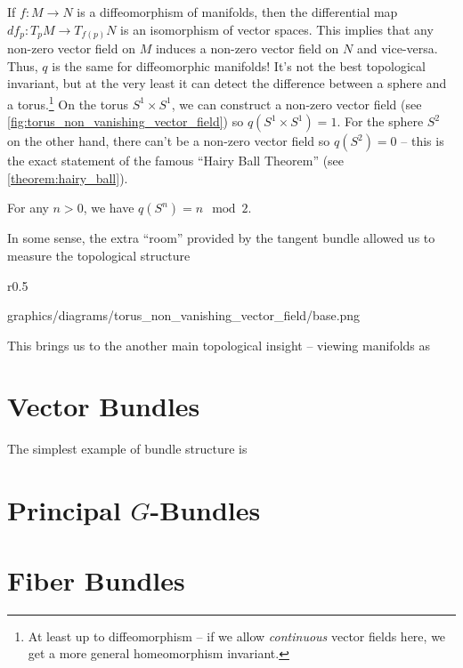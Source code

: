 If $f : M \to N$ is a diffeomorphism of manifolds, then the differential map $df_p : T_p M \to T_{f(p)} N$ is an isomorphism of vector spaces. This implies that any non-zero vector field on $M$ induces a non-zero vector field on $N$ and vice-versa. Thus, $q$ is the same for diffeomorphic manifolds!
It's not the best topological invariant, but at the very least it can detect the difference between a sphere and a torus.\footnote{At least up to diffeomorphism -- if we allow \emph{continuous} vector fields here, we get a more general homeomorphism invariant.} 
On the torus $S^1\times S^1$, we can construct a non-zero vector field (see \cref{fig:torus_non_vanishing_vector_field}) so $q(S^1\times S^1)=1$. For the sphere $S^2$ on the other hand, there can't be a non-zero vector field so $q(S^2)=0$ -- this is the exact statement of the famous ``Hairy Ball Theorem'' (see \cref{theorem:hairy_ball}).

\begin{theorem}\label{theorem:hairy_ball}
  For any $n>0$, we have $q(S^n) = n\mod 2$. 
\end{theorem}

In some sense, the extra ``room'' provided by the tangent bundle allowed us to measure the topological structure 


\begin{wrapfigure}{r}{0.5\textwidth}
	\centering
	\begin{lkx_diagram}{graphics/diagrams/torus_non_vanishing_vector_field/base.png}
	\end{lkx_diagram}
	\caption{A non-zero vector field on a torus.}\label{fig:torus_non_vanishing_vector_field}
\end{wrapfigure}

\vspace{1em}


%
This brings us to the another main topological insight -- viewing manifolds as 
%

{\color{red}\lipsum[1-2]}

\section{Vector Bundles}

The simplest example of bundle structure is 

\section{Principal \texorpdfstring{$G$}{G}-Bundles}

\cite{milnor1963groups}

\section{Fiber Bundles}
